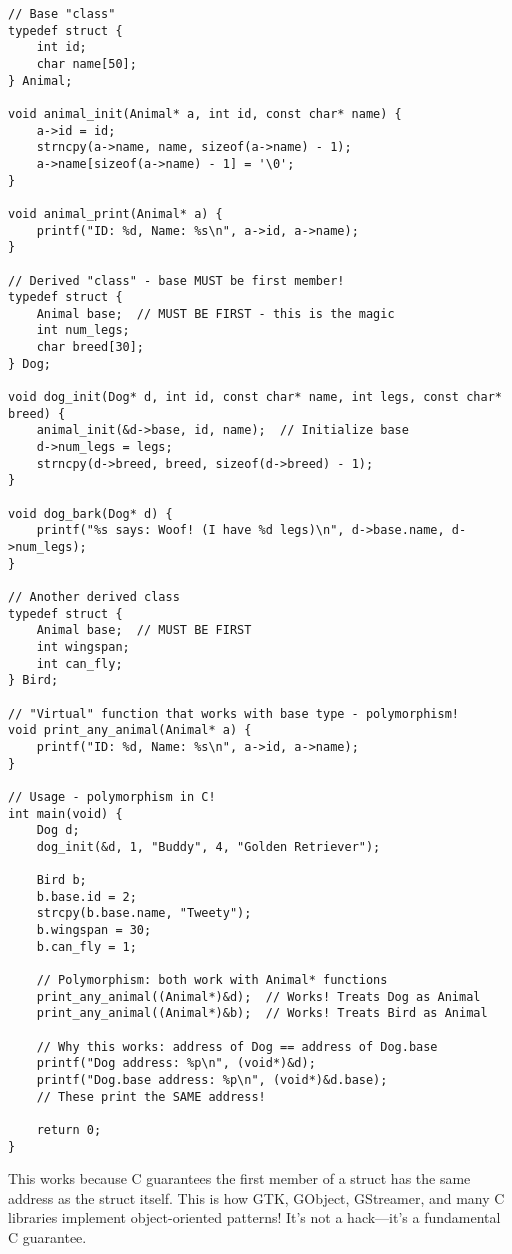 \begin{lstlisting}
// Base "class"
typedef struct {
    int id;
    char name[50];
} Animal;

void animal_init(Animal* a, int id, const char* name) {
    a->id = id;
    strncpy(a->name, name, sizeof(a->name) - 1);
    a->name[sizeof(a->name) - 1] = '\0';
}

void animal_print(Animal* a) {
    printf("ID: %d, Name: %s\n", a->id, a->name);
}

// Derived "class" - base MUST be first member!
typedef struct {
    Animal base;  // MUST BE FIRST - this is the magic
    int num_legs;
    char breed[30];
} Dog;

void dog_init(Dog* d, int id, const char* name, int legs, const char* breed) {
    animal_init(&d->base, id, name);  // Initialize base
    d->num_legs = legs;
    strncpy(d->breed, breed, sizeof(d->breed) - 1);
}

void dog_bark(Dog* d) {
    printf("%s says: Woof! (I have %d legs)\n", d->base.name, d->num_legs);
}

// Another derived class
typedef struct {
    Animal base;  // MUST BE FIRST
    int wingspan;
    int can_fly;
} Bird;

// "Virtual" function that works with base type - polymorphism!
void print_any_animal(Animal* a) {
    printf("ID: %d, Name: %s\n", a->id, a->name);
}

// Usage - polymorphism in C!
int main(void) {
    Dog d;
    dog_init(&d, 1, "Buddy", 4, "Golden Retriever");

    Bird b;
    b.base.id = 2;
    strcpy(b.base.name, "Tweety");
    b.wingspan = 30;
    b.can_fly = 1;

    // Polymorphism: both work with Animal* functions
    print_any_animal((Animal*)&d);  // Works! Treats Dog as Animal
    print_any_animal((Animal*)&b);  // Works! Treats Bird as Animal

    // Why this works: address of Dog == address of Dog.base
    printf("Dog address: %p\n", (void*)&d);
    printf("Dog.base address: %p\n", (void*)&d.base);
    // These print the SAME address!

    return 0;
}
\end{lstlisting}

\begin{notebox}
This works because C guarantees the first member of a struct has the same address as the struct itself. This is how GTK, GObject, GStreamer, and many C libraries implement object-oriented patterns! It's not a hack—it's a fundamental C guarantee.
\end{notebox}

